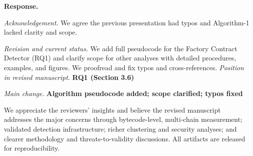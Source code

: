 \documentclass[acmsmall]{acmart}
\begin{document}
	\noindent
	\textbf{Response.}

	\textit{Acknowledgement.} We agree the previous presentation had typos and Algorithm-1 lacked
	clarity and scope.

	\textit{Revision and current status.} We add full pseudocode for the Factory Contract Detector (RQ1)
	and clarify scope for other analyses with detailed procedures, examples, and figures. We
	proofread and fix typos and cross-references. \textit{Position in revised manuscript.}
	{\color{red}\textbf{RQ1 (Section 3.6)}}

	\textit{Main change.}
	{\color{blue}\textbf{Algorithm pseudocode added; scope clarified; typos fixed}}

	\vspace{1em}
	\noindent
	We appreciate the reviewers’ insights and believe the revised manuscript addresses the major concerns
	through bytecode-level, multi-chain measurement; validated detection infrastructure; richer
	clustering and security analyses; and clearer methodology and threats-to-validity discussions.
	All artifacts are released for reproducibility.
\end{document}
